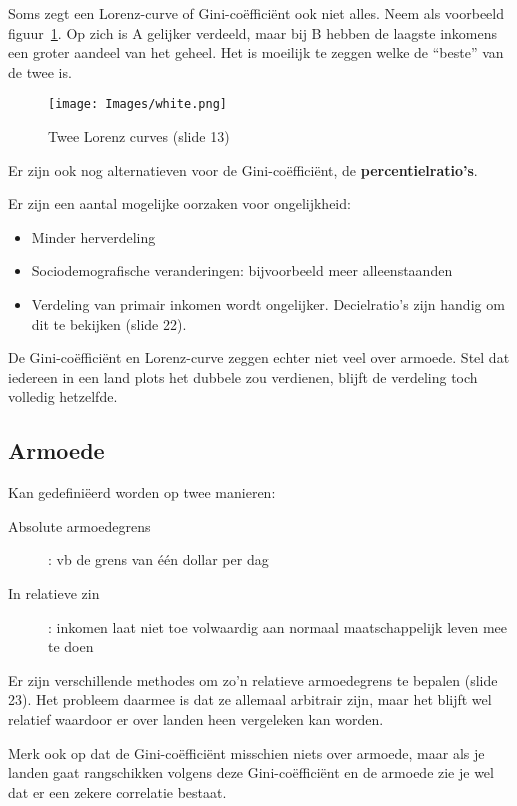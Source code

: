 Soms zegt een Lorenz-curve of Gini-co\"effici\"ent ook niet alles. Neem als voorbeeld figuur~\ref{fig:tweeLorenzCurves}. Op zich is A gelijker verdeeld, maar bij B hebben de laagste inkomens een groter aandeel van het geheel. Het is moeilijk te zeggen welke de ``beste'' van de twee is.
\begin{figure}[htbp]
   \centering
   \texttt{[image: Images/white.png]}
   \caption{Twee Lorenz curves (slide 13)}
   \label{fig:tweeLorenzCurves}
\end{figure}

Er zijn ook nog alternatieven voor de Gini-co\"effici\"ent, de \textbf{percentielratio's}.

Er zijn een aantal mogelijke oorzaken voor ongelijkheid:
\begin{itemize}
   \item Minder herverdeling
   \item Sociodemografische veranderingen: bijvoorbeeld meer alleenstaanden
   \item Verdeling van primair inkomen wordt ongelijker. Decielratio's zijn handig om dit te bekijken (slide 22).
\end{itemize}

De Gini-co\"effici\"ent en Lorenz-curve zeggen echter niet veel over armoede. Stel dat iedereen in een land plots het dubbele zou verdienen, blijft de verdeling toch volledig hetzelfde.

\subsection{Armoede}
Kan gedefini\"eerd worden op twee manieren:
\begin{description}
   \item[Absolute armoedegrens]: vb de grens van \'e\'en dollar per dag
   \item[In relatieve zin]: inkomen laat niet toe volwaardig aan normaal maatschappelijk leven mee te doen
\end{description}
Er zijn verschillende methodes om zo'n relatieve armoedegrens te bepalen (slide 23). Het probleem daarmee is dat ze allemaal arbitrair zijn, maar het blijft wel relatief waardoor er over landen heen vergeleken kan worden.

Merk ook op dat de Gini-co\"effici\"ent misschien niets over armoede, maar als je landen gaat rangschikken volgens deze Gini-co\"effici\"ent en de armoede zie je wel dat er een zekere correlatie bestaat.
